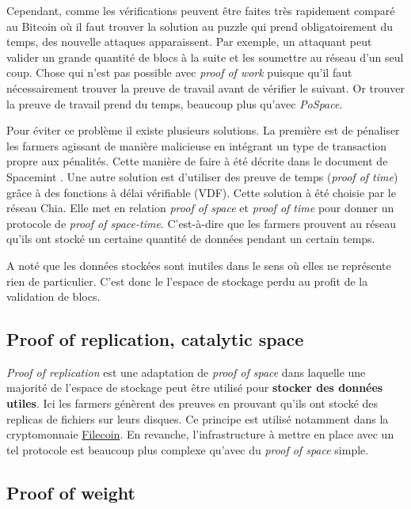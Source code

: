 Cependant, comme les vérifications peuvent être faites très rapidement comparé au Bitcoin où il faut trouver la solution au puzzle qui prend obligatoirement du temps, des nouvelle attaques apparaissent. Par exemple, un attaquant peut valider un grande quantité de blocs à la suite et les soumettre au réseau d'un seul coup. Chose qui n'est pas possible avec \textit{proof of work} puisque qu'il faut nécessairement trouver la preuve de travail avant de vérifier le suivant. Or trouver la preuve de travail prend du temps, beaucoup plus qu'avec \textit{PoSpace}. 

Pour éviter ce problème il existe plusieurs solutions. La première est de pénaliser les farmers agissant de manière malicieuse en intégrant un type de transaction propre aux pénalités. Cette manière de faire à été décrite dans le document de Spacemint \cite{DBLP:conf/fc/ParkKFGAP18}. Une autre solution est d'utiliser des preuve de temps (\textit{proof of time}) grâce à des fonctions à délai vérifiable (VDF). Cette solution à été choisie par le réseau Chia. Elle met en relation \textit{proof of space} et \textit{proof of time} pour donner un protocole de \textit{proof of space-time}. C'est-à-dire que les farmers prouvent au réseau qu'ils ont stocké un certaine quantité de données pendant un certain temps.

A noté que les données stockées sont inutiles dans le sens où elles ne représente rien de particulier. C'est donc le l'espace de stockage perdu au profit de la validation de blocs.

\subsection{Proof of replication, catalytic space}

\textit{Proof of replication} est une adaptation de \textit{proof of space} dans laquelle une majorité de l'espace de stockage peut être utilisé pour \textbf{stocker des données utiles}. Ici les farmers génèrent des preuves en prouvant qu'ils ont stocké des replicas de fichiers sur leurs disques. Ce principe est utilisé notamment dans la cryptomonnaie \href{https://filecoin.io/}{Filecoin}. En revanche, l'infrastructure à mettre en place avec un tel protocole est beaucoup plus complexe qu'avec du \textit{proof of space} simple.

\subsection{Proof of weight}

